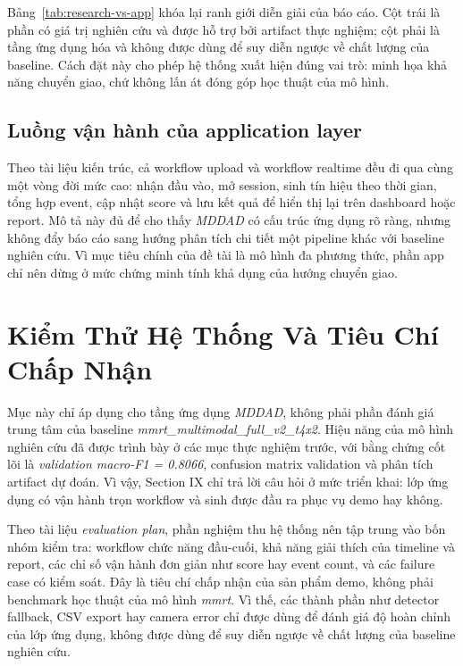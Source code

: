 \documentclass[conference,a4paper]{IEEEtran}
\begin{document}
Bảng~\ref{tab:research-vs-app} khóa lại ranh giới diễn giải của báo cáo. Cột trái là phần có giá trị nghiên cứu và được hỗ trợ bởi artifact thực nghiệm; cột phải là tầng ứng dụng hóa và không được dùng để suy diễn ngược về chất lượng của baseline. Cách đặt này cho phép hệ thống xuất hiện đúng vai trò: minh họa khả năng chuyển giao, chứ không lấn át đóng góp học thuật của mô hình.

\subsection{Luồng vận hành của application layer}
Theo tài liệu kiến trúc, cả workflow upload và workflow realtime đều đi qua cùng một vòng đời mức cao: nhận đầu vào, mở session, sinh tín hiệu theo thời gian, tổng hợp event, cập nhật score và lưu kết quả để hiển thị lại trên dashboard hoặc report. Mô tả này đủ để cho thấy \textit{MDDAD} có cấu trúc ứng dụng rõ ràng, nhưng không đẩy báo cáo sang hướng phân tích chi tiết một pipeline khác với baseline nghiên cứu. Vì mục tiêu chính của đề tài là mô hình đa phương thức, phần app chỉ nên dừng ở mức chứng minh tính khả dụng của hướng chuyển giao.

\section[Kiem Thu He Thong Va Tieu Chi Chap Nhan]{Kiểm Thử Hệ Thống Và Tiêu Chí Chấp Nhận}
Mục này chỉ áp dụng cho tầng ứng dụng \textit{MDDAD}, không phải phần đánh giá trung tâm của baseline \textit{mmrt\_multimodal\_full\_v2\_t4x2}. Hiệu năng của mô hình nghiên cứu đã được trình bày ở các mục thực nghiệm trước, với bằng chứng cốt lõi là \textit{validation macro-F1 = 0.8066}, confusion matrix validation và phân tích artifact dự đoán. Vì vậy, Section IX chỉ trả lời câu hỏi ở mức triển khai: lớp ứng dụng có vận hành trọn workflow và sinh được đầu ra phục vụ demo hay không.

Theo tài liệu \textit{evaluation plan}, phần nghiệm thu hệ thống nên tập trung vào bốn nhóm kiểm tra: workflow chức năng đầu-cuối, khả năng giải thích của timeline và report, các chỉ số vận hành đơn giản như score hay event count, và các failure case có kiểm soát. Đây là tiêu chí chấp nhận của sản phẩm demo, không phải benchmark học thuật của mô hình \textit{mmrt}. Vì thế, các thành phần như detector fallback, CSV export hay camera error chỉ được dùng để đánh giá độ hoàn chỉnh của lớp ứng dụng, không được dùng để suy diễn ngược về chất lượng của baseline nghiên cứu.
\end{document}
